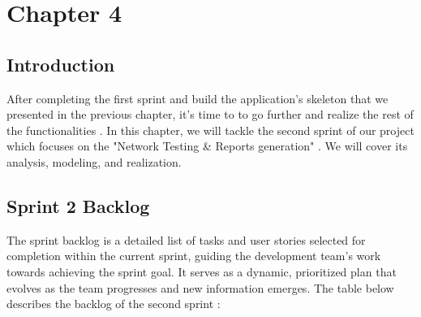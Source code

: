 
\chapter*{Chapter 4}


\setcounter{chapter}{4}
\setcounter{section}{0}
\setcounter{table}{0} 
\setcounter{figure}{0} 


\vspace{0.25cm}

\setcounter{tocdepth}{1}
\headrule


\localtableofcontents
\newpage

\section*{Introduction}
After completing the first sprint and build the application's skeleton that we presented in the previous chapter, it's time to to go further and realize the rest of the functionalities .   
In this chapter, we will tackle the second sprint of our project which focuses on the "Network Testing \& Reports generation" .
We will cover its analysis, modeling, and realization.

\section{Sprint 2 Backlog}

The sprint backlog is a detailed list of tasks and user stories selected for completion within the current sprint, guiding the development team's work towards achieving the sprint goal. It serves as a dynamic, prioritized plan that evolves as the team progresses and new information emerges.
The table below describes the backlog of the second sprint :



